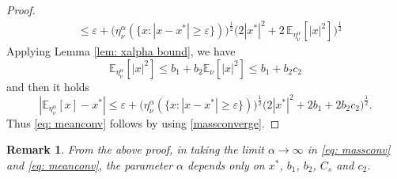 \documentclass[reqno]{amsart}
\numberwithin{algorithm}{section}
\newcommand{\EE}{{\mathbb E}}
\newtheorem{remark}[theorem]{Remark}
\begin{document}
{\begin{proof}
\begin{align}
  &\leq \varepsilon + \bigg(\eta_\nu^\alpha(\{x:|x-x^*|\geq \varepsilon\}) \bigg)^{\frac{1}{2}} \bigg( 2 |x^*|^2 + 2\,\EE_{\eta_\nu^\alpha}[|x|^2]\bigg)^{\frac{1}{2}}
\end{align}
 Applying Lemma \ref{lem: xalpha bound}, we have 
\begin{equation}\label{bound second moment eta}
  \EE_{\eta_\nu^\alpha}[|x|^2]\leq b_1+b_2 \EE_\nu[|x|^2]\leq b_1+b_2c_2
\end{equation}
and then it holds
\begin{equation*}
    |\EE_{\eta_\nu^\alpha}[x]-x^*|\leq \varepsilon+\bigg(\eta_\nu^\alpha(\{x:|x-x^*|\geq \varepsilon\}) \bigg)^{\frac{1}{2}} \bigg(2 |x^*|^2 + 2b_1 + 2b_2c_2\bigg)^{\frac{1}{2}}.
\end{equation*}
Thus \eqref{eq: meanconv} follows by using \eqref{massconverge}.
\end{proof}
\begin{remark}\label{rmk:uniform_convergence}
   From the above proof, in taking the limit \(\alpha\to\infty\) in \eqref{eq: massconv} and \eqref{eq: meanconv}, the parameter \(\alpha\) depends only on \(x^*\), \(b_1\), \(b_2\), \(C_s\) and \(c_2\).
\end{remark}


}
\end{document}
